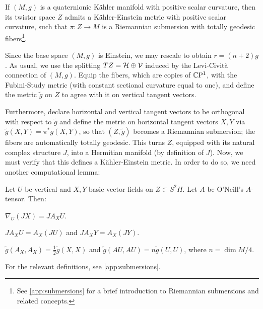 \begin{thm}\label{thm:twistorKE}
	If $(M,g)$ is a quaternionic K\"ahler manifold with positive scalar curvature, then its twistor space $Z$ admits a K\"ahler-Einstein metric with positive scalar curvature, such that $\pi:Z\to M$ is a Riemannian submersion with totally geodesic fibers\footnote{See \cref{app:submersions} for a brief introduction to Riemannian submersions and related concepts.}.
\end{thm}
\begin{myproof}
	Since the base space $(M,g)$ is Einstein, we may rescale to obtain $r=(n+2)g$. As usual, we use the splitting $TZ=\mathcal{H}\oplus \mathcal{V}$ induced by the Levi-Civit\`a connection of $(M,g)$. Equip the fibers, which are copies of $\mathbb{C}\mathrm{P}^1$, with the Fubini-Study metric (with constant sectional curvature equal to one), and define the metric $\tilde g$ on $Z$ to agree with it on vertical tangent vectors. 
	
	Furthermore, declare horizontal and vertical tangent vectors to be orthogonal with respect to $\tilde g$ and define the metric on horizontal tangent vectors $X,Y$ via $\tilde g(X,Y)=\pi^*g(X,Y)$, so that $(Z,\tilde g)$ becomes a Riemannian submersion; the fibers are automatically totally geodesic. This turns $Z$, equipped with its natural complex structure $J$, into a Hermitian manifold (by definition of $J$). Now, we must verify that this defines a K\"ahler-Einstein metric. In order to do so, we need another computational lemma:
	
	\begin{lem}
		Let $U$ be vertical and $X,Y$ basic vector fields on $Z\subset S^2H$. Let $A$ be O'Neill's $A$-tensor. Then:
		\begin{numberedlist}
			\item $\nabla_U (JX)=JA_XU$.
			\item $JA_XU=A_X(JU)$ and $JA_XY=A_X(JY)$.
			\item $\tilde g(A_X, A_X)=\frac{1}{2}\tilde g(X,X)$ and $\tilde g(AU,AU)=n\tilde g(U,U)$, where $n=\dim M/4$.
		\end{numberedlist}
		For the relevant definitions, see \cref{app:submersions}.
	\end{lem}
	

\end{myproof}
